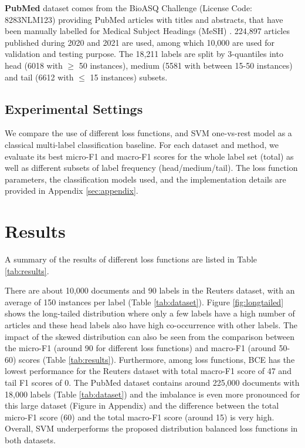\documentclass[11pt]{article}
\begin{document}
\textbf{PubMed} dataset comes from the BioASQ Challenge  (License Code: 8283NLM123) providing PubMed articles with titles and abstracts, that have been manually labelled for Medical Subject Headings (MeSH)   \citep{BIOASQ, pubmed_nar}. 224,897 articles published during 2020 and 2021 are used, among which 10,000 are used for validation and testing purpose. The 18,211 labels are split by 3-quantiles into head (6018 with $\ge$ 50 instances), medium (5581 with between 15-50 instances) and tail (6612 with $\le$ 15 instances) subsets.



\subsection{Experimental Settings}
We compare the use of 
different loss functions, and SVM one-vs-rest model as a classical multi-label classification baseline. 
For each dataset and method, we evaluate its best micro-F1 and macro-F1 scores   \citep{wu-etal-2019-learning-learn, Lipton-F1} for the whole label set (total) as well as different 
subsets of label frequency (head/medium/tail). The loss function parameters, the classification models used, and the implementation details are provided in Appendix \ref{sec:appendix}. 





\section{Results}
A summary of the results of different loss functions are listed in Table \ref{tab:results}.

There are about 10,000 documents and 90 labels in the Reuters dataset, with an average of 150 instances per label (Table \ref{tab:dataset}). Figure \ref{fig:longtailed} shows the long-tailed distribution where only a few labels have a high number of articles and these head labels also have high co-occurrence with other labels.  The impact of the skewed distribution can also be seen from the comparison between the micro-F1 (around 90 for different loss functions) and macro-F1 (around 50-60) scores (Table \ref{tab:results}). Furthermore, 
among loss functions, BCE
has the lowest performance for the Reuters dataset with total macro-F1 score of 47 and tail F1 scores of 0. The PubMed dataset contains around 225,000 documents with 18,000 labels (Table \ref{tab:dataset}) and the imbalance is even more pronounced for this large dataset (Figure in Appendix) and the difference between the total micro-F1 score (60) and the total macro-F1 score (around 15) is very high. 
Overall, SVM underperforms the proposed distribution balanced loss functions in both datasets.
\end{document}
